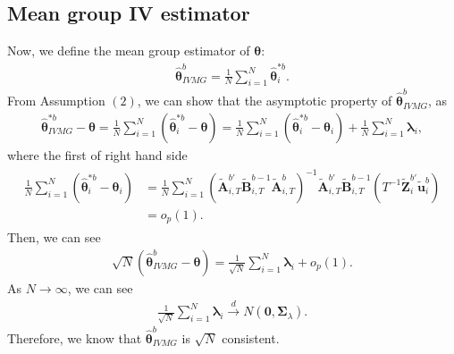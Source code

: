 \documentclass[12pt,a4paper,hyperref]{article}
\begin{document}
\subsection{Mean group IV estimator }
Now, we define the mean group estimator of $\boldsymbol{\theta}$:
\begin{align}
\hat{\boldsymbol{\theta}}^{b}_{IVMG}=\frac{1}{N}\sum^{N}_{i=1}\hat{\boldsymbol{\theta}}^{\ast b}_{i}.
\end{align}
From Assumption $(2)$, we can show that the asymptotic property of $\hat{\boldsymbol{\theta}}^{b}_{IVMG}$, as
\begin{align}
\hat{\boldsymbol{\theta}}^{\ast b}_{IVMG}-\boldsymbol{\theta}=\frac{1}{N}\sum^{N}_{i=1}\left(\hat{\boldsymbol{\theta}}^{\ast b}_{i}- \boldsymbol{\theta}\right)=\frac{1}{N}\sum^{N}_{i=1}\left(\hat{\boldsymbol{\theta}}^{\ast b}_{i}- \boldsymbol{\theta}_{i}\right)+\frac{1}{N}\sum^{N}_{i=1}\boldsymbol{\lambda}_{i},
\end{align}
where the first of right hand side
\begin{align}
\begin{split}
\frac{1}{N}\sum^{N}_{i=1}\left(\hat{\boldsymbol{\theta}}^{\ast b}_{i}- \boldsymbol{\theta}_{i}\right)&=\frac{1}{N}\sum^{N}_{i=1} \left(\tilde{\boldsymbol{A}}_{i,T}^{b'}\tilde{\boldsymbol{B}}_{i,T}^{b -1}\tilde{\boldsymbol{A}}^{b}_{i,T} \right)^{-1}\tilde{\boldsymbol{A}}_{i,T}^{b'}\tilde{\boldsymbol{B}}_{i,T}^{b -1}\left(T^{-1}  \tilde{\boldsymbol{Z}}^{b'}_{i}\tilde{\boldsymbol{u}}^{b}_{i} \right) \\
&= o_{p}\left(1 \right).
\end{split}
\end{align}
Then, we can see
\begin{align}
\sqrt{N}\left(\hat{\boldsymbol{\theta}}^{b}_{IVMG}-\boldsymbol{\theta}  \right)=\frac{1}{\sqrt{N}}\sum^{N}_{i=1}\boldsymbol{\lambda}_{i}+o_{p} \left(1 \right).
\end{align}
As $N \to \infty$, we can see
\begin{align}
\frac{1}{\sqrt{N}}\sum^{N}_{i=1}\boldsymbol{\lambda}_{i} \overset{d}{\to}  N\left(\boldsymbol{0},\boldsymbol{\Sigma}_{\lambda} \right).
\end{align}
Therefore, we know that $\hat{\boldsymbol{\theta}}^{b}_{IVMG}$ is $\sqrt{N}$ consistent.
\end{document}
